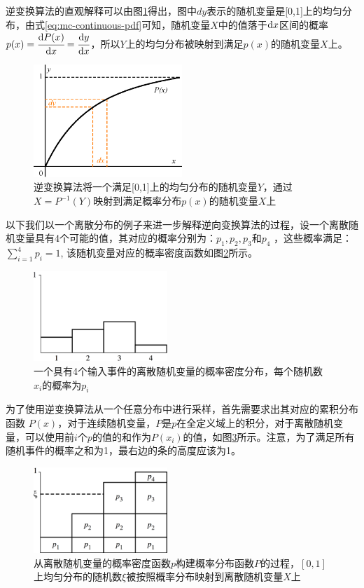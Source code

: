 逆变换算法的直观解释可以由图\ref{f:mc-inversion-method}得出，图中$dy$表示的随机变量是[0,1]上的均匀分布，由式\ref{eq:mc-continuous-pdf}可知，随机变量$X$中的值落于${\rm d}x$区间的概率$p(x)= \cfrac{{\rm d}P(x)}{{\rm d}x}= \cfrac{{\rm d}y}{{\rm d}x}$，所以$Y$上的均匀分布被映射到满足$p(x)$的随机变量$X$上。

\begin{figure}
	\sidecaption
	\includegraphics[width=0.5\textwidth]{figures/mc/inversion-method}
	\caption{逆变换算法将一个满足[0,1]上的均匀分布的随机变量$Y$，通过$X=P^{-1}(Y)$映射到满足概率分布$p(x)$的随机变量$X$上}
	\label{f:mc-inversion-method}
\end{figure}

以下我们以一个离散分布的例子来进一步解释逆向变换算法的过程，设一个离散随机变量具有4个可能的值，其对应的概率分别为：$p_1,p_2,p_3$和$p_4$ ，这些概率满足：$\sum_{i=1}^{4}p_i=1$, 该随机变量对应的概率密度函数如图\ref{f:simple-pdf}所示。

\begin{figure}
\sidecaption
	\includegraphics[width=0.45\textwidth]{figures/mc/mc-3}
	\caption{一个具有4个输入事件的离散随机变量的概率密度分布，每个随机数$x_i$的概率为$p_i$}
	\label{f:simple-pdf}
\end{figure}

为了使用逆变换算法从一个任意分布中进行采样，首先需要求出其对应的累积分布函数
$P(x)$，对于连续随机变量，$P$是$p$在全定义域上的积分，对于离散随机变量，可以使用前$i$个$p$的值的和作为$P(x_i)$的值，如图\ref{f:mc-discrete-cdf}所示。注意，为了满足所有随机事件的概率之和为1，最右边的条的高度应该为1。

\begin{figure}
\sidecaption
	\includegraphics[width=0.45\textwidth]{figures/mc/mc-4}
	\caption{从离散随机变量的概率密度函数$p$构建概率分布函数$P$的过程，$[0,1]$上均匀分布的随机数$\xi$被按照概率分布映射到离散随机变量$X$上}
	\label{f:mc-discrete-cdf}
\end{figure}

